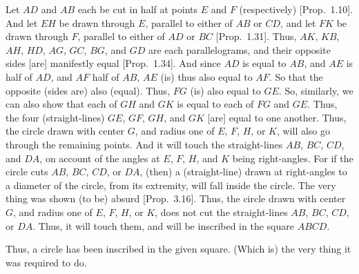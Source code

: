\begin{Parallel}{}{}
{Let  $AD$ and $AB$ each be cut in half at points $E$ and $F$ (respectively)
[Prop.~1.10]. And let $EH$ be drawn through $E$, parallel
to either of $AB$ or $CD$, and let $FK$ be drawn through $F$, parallel to either of $AD$ or $BC$ [Prop.~1.31].
Thus, $AK$, $KB$, $AH$, $HD$, $AG$, $GC$, $BG$, and $GD$ are each parallelograms,
and their opposite sides [are] manifestly equal [Prop.~1.34].
And since $AD$ is equal to $AB$, and $AE$ is half of $AD$, and $AF$ half of
$AB$, $AE$ (is) thus also equal to $AF$. So that the opposite (sides are) also (equal).
Thus, $FG$ (is) also equal to $GE$. So, similarly, we can also show that each of
$GH$ and $GK$ is equal to each of $FG$ and $GE$. Thus, the four (straight-lines)
$GE$, $GF$, $GH$, and $GK$ [are] equal to one another. Thus, the circle drawn
with center $G$, and radius one of $E$, $F$, $H$, or $K$, will also go through the remaining points. And it will touch the straight-lines $AB$, $BC$, $CD$, and $DA$,
on account of the angles at $E$, $F$, $H$, and $K$ being right-angles. For if the
circle cuts $AB$, $BC$, $CD$, or $DA$, (then) a (straight-line) drawn at right-angles to a diameter of the circle, from its extremity, will fall inside the circle. 
The very thing was shown (to be) absurd [Prop.~3.16].  Thus, the
circle drawn with center $G$, and radius one of $E$, $F$, $H$, or $K$, does not
cut the straight-lines $AB$, $BC$, $CD$, or $DA$. Thus, it will touch them, and will
be inscribed in the square $ABCD$.

Thus, a circle has been inscribed in the given square. (Which is) the very thing it was required to do.}
\end{Parallel}

